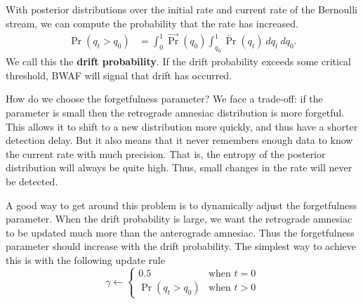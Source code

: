 With posterior distributions over the initial rate and current rate of the Bernoulli stream, we can compute the probability that the rate has increased. 
\begin{align}
    \Pr(q_t > q_0) &= \int_0^1 \overrightarrow{\Pr}(q_0) \int_{q_0}^1 \overleftarrow{\Pr}(q_t) ~dq_t ~ dq_0.
\end{align}
We call this the {\bf drift probability}. If the drift probability exceeds some critical threshold, BWAF will signal that drift has occurred.


How do we choose the forgetfulness parameter? We face a trade-off: if the parameter is small then the retrograde amnesiac distribution is more forgetful. This allows it to shift to a new distribution more quickly, and thus have a shorter detection delay. But it also means that it never remembers enough data to know the current rate with much precision. That is, the entropy of the posterior distribution will always be quite high. Thus, small changes in the rate will never be detected.

A good way to get around this problem is to dynamically adjust the forgetfulness parameter. When the drift probability is large, we want the retrograde amnesiac to be updated much more than the anterograde amnesiac. Thus the forgetfulness parameter should increase with the drift probability. The simplest way to achieve this is with the following update rule
\begin{equation}
    \gamma \gets \begin{cases}
        0.5 & \text{when }t=0 \\
        \Pr(q_t > q_0) & \text{when }t>0
    \end{cases}
\end{equation}

